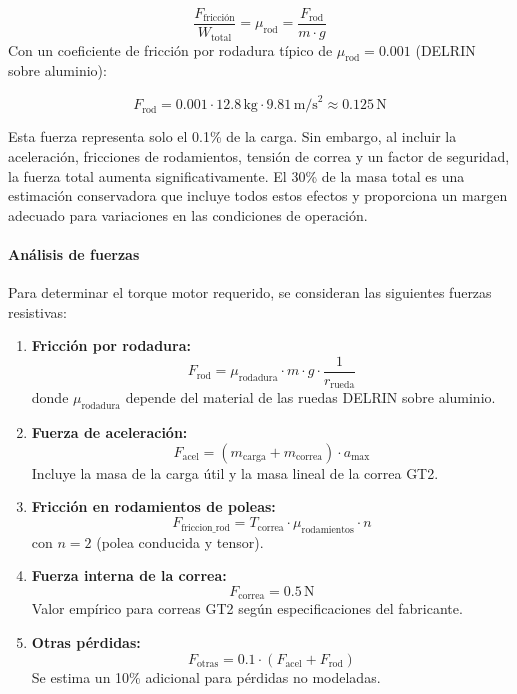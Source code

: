 \[\frac{F_{\text{fricción}}}{W_{\text{total}}} = \mu_{\text{rod}} = \frac{F_{\text{rod}}}{m \cdot g}\]
Con un coeficiente de fricción por rodadura típico de $\mu_{\text{rod}} = 0.001$ (DELRIN sobre aluminio):

\[F_{\text{rod}} = 0.001 \cdot 12.8\,\text{kg} \cdot 9.81\,\text{m/s}^2 \approx 0.125\,\text{N}\]

Esta fuerza representa solo el 0.1\% de la carga. Sin embargo, al incluir la aceleración, fricciones de rodamientos, tensión de correa y un factor de seguridad, la fuerza total aumenta significativamente. El 30\% de la masa total es una estimación conservadora que incluye todos estos efectos y proporciona un margen adecuado para variaciones en las condiciones de operación.

\paragraph{Análisis de fuerzas}
Para determinar el torque motor requerido, se consideran las siguientes fuerzas resistivas:

\begin{enumerate}
    \item \textbf{Fricción por rodadura:}
    \begin{equation}
    F_{\text{rod}} = \mu_{\text{rodadura}} \cdot m \cdot g \cdot \frac{1}{r_{\text{rueda}}}
    \end{equation}
    donde $\mu_{\text{rodadura}}$ depende del material de las ruedas DELRIN sobre aluminio.
    
    \item \textbf{Fuerza de aceleración:}
    \begin{equation}
    F_{\text{acel}} = (m_{\text{carga}} + m_{\text{correa}}) \cdot a_{\text{max}}
    \end{equation}
    Incluye la masa de la carga útil y la masa lineal de la correa GT2.
    
    \item \textbf{Fricción en rodamientos de poleas:}
    \begin{equation}
    F_{\text{friccion\_rod}} = T_{\text{correa}} \cdot \mu_{\text{rodamientos}} \cdot n
    \end{equation}
    con $n = 2$ (polea conducida y tensor).
    
    \item \textbf{Fuerza interna de la correa:}
    \begin{equation}
    F_{\text{correa}} = 0.5\,\text{N}
    \end{equation}
    Valor empírico para correas GT2 según especificaciones del fabricante.
    
    \item \textbf{Otras pérdidas:}
    \begin{equation}
    F_{\text{otras}} = 0.1 \cdot (F_{\text{acel}} + F_{\text{rod}})
    \end{equation}
    Se estima un 10\% adicional para pérdidas no modeladas.
\end{enumerate}

